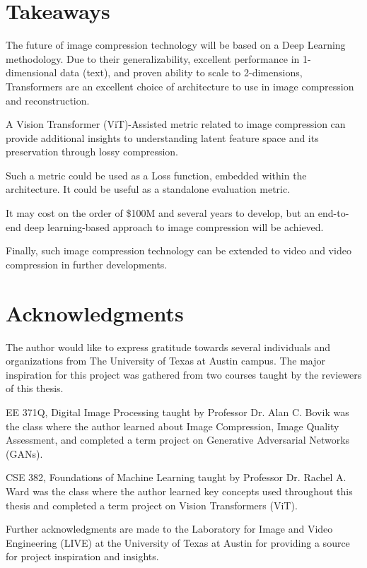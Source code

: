 \section{Takeaways}

The future of image compression technology will be based on a Deep Learning methodology.
Due to their generalizability, excellent performance in 1-dimensional data (text),
and proven ability to scale to 2-dimensions, Transformers are an excellent choice of 
architecture to use in image compression and reconstruction.


A Vision Transformer (ViT)-Assisted metric related to image compression can provide 
additional insights to understanding latent feature space and its preservation through lossy compression.


Such a metric could be used as a Loss function, embedded within the architecture.
It could be useful as a standalone evaluation metric.


It may cost on the order of \$100M and several years to develop, but an end-to-end deep learning-based approach
to image compression will be achieved.


Finally, such image compression technology can be extended to video and video compression in further developments.


\section{Acknowledgments}

The author would like to express gratitude towards several individuals and organizations
from The University of Texas at Austin campus.
The major inspiration for this project was gathered from two courses taught by the
reviewers of this thesis.


EE 371Q, Digital Image Processing taught by Professor Dr. Alan C. Bovik was the class
where the author learned about 
Image Compression, Image Quality Assessment, and completed a term
project on Generative Adversarial Networks (GANs).


CSE 382, Foundations of Machine Learning taught by Professor Dr. Rachel A. Ward 
was the class where the author learned key concepts used throughout this thesis
and completed a term project on Vision Transformers (ViT).


Further acknowledgments are made to the Laboratory for Image and Video Engineering (LIVE) at the 
University of Texas at Austin for providing a source for project inspiration and insights.

